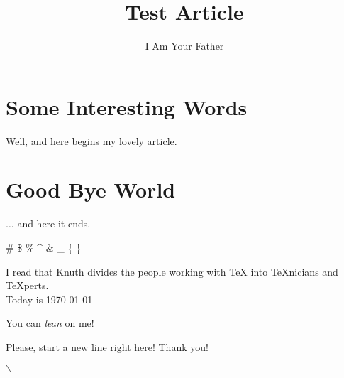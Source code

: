 \documentclass[UTF8]{article}
\author{I Am Your Father}
\title{Test Article}
\begin{document}
	
	\maketitle
	
	
	\section{Some Interesting Words}
	Well, and here begins my lovely article.
	
	\section{Good Bye World}
	
	$\ldots$ and here it ends. 
	
	
	\# \$  \% \^{} \& \_ \{  \} \  {} 
	
	I read that Knuth divides the people working with \TeX{} into \TeX{}nicians and \TeX perts.\\
	
	Today is \today
	
	You can \textsl{lean} on me! 
	
	Please, start a new line right here!\newline
	Thank you!
	
	$\backslash$
	
	
\end{document}
